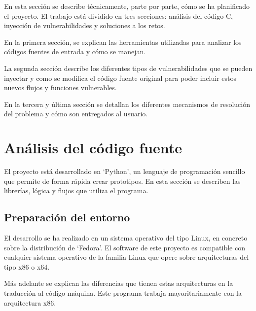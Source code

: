 En esta sección se describe técnicamente, parte por parte, cómo se ha planificado el proyecto.
El trabajo está dividido en tres secciones: análisis del código C, inyección de vulnerabilidades y soluciones a los retos.

En la primera sección, se explican las herramientas utilizadas para analizar los códigos fuentes de entrada y cómo se manejan.

La segunda sección describe los diferentes tipos de vulnerabilidades que se pueden inyectar y como se modifica el código fuente original para poder incluir estos nuevos flujos y funciones vulnerables.

En la tercera y última sección se detallan los diferentes mecanismos de resolución del problema y cómo son entregados al usuario.
\section{Análisis del código fuente}
El proyecto está desarrollado en `Python', un lenguaje de programación sencillo que permite de forma rápida crear prototipos. En esta sección se describen las librerías, lógica y flujos que utiliza el programa.

\subsection{Preparación del entorno} \label{subsec:entorno}
El desarrollo se ha realizado en un sistema operativo del tipo Linux, en concreto sobre la distribución de `Fedora'.
El software de este proyecto es compatible con cualquier sistema operativo de la familia Linux que opere sobre arquitecturas del tipo \acrfull{x86} o \acrfull{x64}.

Más adelante se explican las diferencias que tienen estas arquitecturas en la traducción al código máquina.
Este programa trabaja mayoritariamente con la arquitectura \acrshort{x86}.


